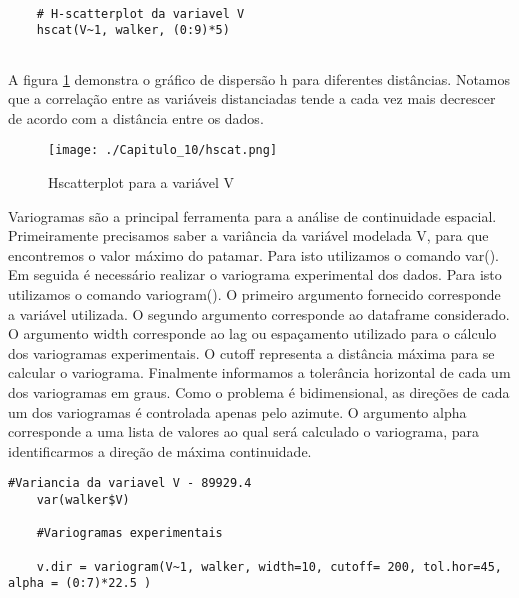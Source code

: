 \begin{scriptsize}
	\estiloR
	\begin{lstlisting}[]
	
	# H-scatterplot da variavel V
	hscat(V~1, walker, (0:9)*5)
	
	\end{lstlisting}
\end{scriptsize}

A figura \ref{hscatter} demonstra o gráfico de dispersão h para diferentes distâncias. Notamos que a correlação entre as variáveis distanciadas tende a cada vez mais decrescer de acordo com a distância entre os dados. 

\FloatBarrier
\begin{figure}[H]
	\centering
	\texttt{[image: ./Capitulo\_10/hscat.png]}	
	\caption{Hscatterplot para a variável V}
	\label{hscatter}
\end{figure}
\FloatBarrier

Variogramas são a principal ferramenta para a análise de continuidade espacial. Primeiramente precisamos saber a variância da variável modelada V, para que encontremos o valor máximo do patamar. Para isto utilizamos o comando var(). Em seguida é necessário realizar o variograma experimental dos dados. Para isto utilizamos o comando variogram(). O primeiro argumento fornecido corresponde a variável utilizada. O segundo argumento corresponde ao dataframe considerado. O argumento width corresponde ao lag ou espaçamento utilizado para o cálculo dos variogramas experimentais. O cutoff representa a distância máxima para se calcular o variograma. Finalmente informamos a tolerância horizontal de cada um dos variogramas em graus. Como o problema é bidimensional, as direções de cada um dos variogramas é controlada apenas pelo azimute. O argumento alpha corresponde a uma lista de valores ao qual será calculado o variograma, para identificarmos a direção de máxima continuidade. 

\begin{scriptsize}
	\estiloR
	\begin{lstlisting}[caption={Criação de um vetor em R}, label=lst:rcode]
	#Variancia da variavel V - 89929.4
	var(walker$V)
	
	#Variogramas experimentais 
	
	v.dir = variogram(V~1, walker, width=10, cutoff= 200, tol.hor=45, alpha = (0:7)*22.5 )

	\end{lstlisting}
\end{scriptsize}

